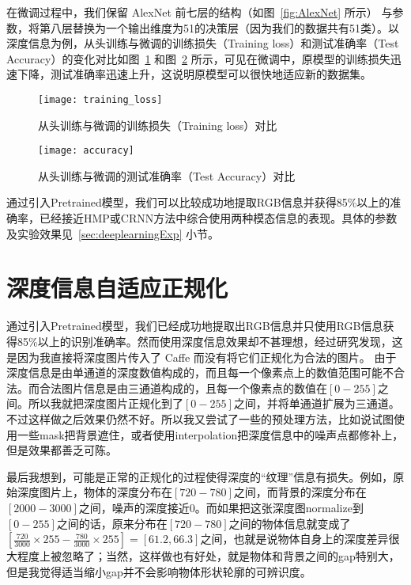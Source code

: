 在微调过程中，我们保留 AlexNet 前七层的结构（如图~\ref{fig:AlexNet} 所示） 与参数，将第八层替换为一个输出维度为51的决策层（因为我们的数据共有51类）。以深度信息为例，从头训练与微调的训练损失（Training loss）和测试准确率（Test Accuracy）的变化对比如图~\ref{fig:training_loss} 和图~\ref{fig:accuracy} 所示，可见在微调中，原模型的训练损失迅速下降，测试准确率迅速上升，这说明原模型可以很快地适应新的数据集。

\begin{figure}[H] %
  \centering
  \texttt{[image: training\_loss]}
  \caption{从头训练与微调的训练损失（Training loss）对比}
  \label{fig:training_loss}
\end{figure}

\begin{figure}[H] %
  \centering
  \texttt{[image: accuracy]}
  \caption{从头训练与微调的测试准确率（Test Accuracy）对比}
  \label{fig:accuracy}
\end{figure}

通过引入Pretrained模型，我们可以比较成功地提取RGB信息并获得85\%以上的准确率，已经接近HMP或CRNN方法中综合使用两种模态信息的表现。具体的参数及实验效果见~\ref{sec:deeplearningExp} 小节。

\section{深度信息自适应正规化}
\label{sec:dNorm}

通过引入Pretrained模型，我们已经成功地提取出RGB信息并只使用RGB信息获得85\%以上的识别准确率。然而使用深度信息效果却不甚理想，经过研究发现，这是因为我直接将深度图片传入了 Caffe 而没有将它们正规化为合法的图片。
由于深度信息是由单通道的深度数值构成的，而且每一个像素点上的数值范围可能不合法。而合法图片信息是由三通道构成的，且每一个像素点的数值在$[0-255]$之间。所以我就把深度图片正规化到了$[0-255]$之间，并将单通道扩展为三通道。不过这样做之后效果仍然不好。所以我又尝试了一些的预处理方法，比如说试图使用一些mask把背景遮住，或者使用interpolation把深度信息中的噪声点都修补上，但是效果都善乏可陈。

最后我想到，可能是正常的正规化的过程使得深度的“纹理”信息有损失。例如，原始深度图片上，物体的深度分布在$[720-780]$之间，而背景的深度分布在$[2000-3000]$之间，噪声的深度接近0。而如果把这张深度图normalize到$[0-255]$之间的话，原来分布在$[720-780]$之间的物体信息就变成了$[\frac{720}{3000} \times 255 - \frac{780}{3000} \times 255] = [61.2, 66.3]$之间，也就是说物体自身上的深度差异很大程度上被忽略了；当然，这样做也有好处，就是物体和背景之间的gap特别大，但是我觉得适当缩小gap并不会影响物体形状轮廓的可辨识度。

